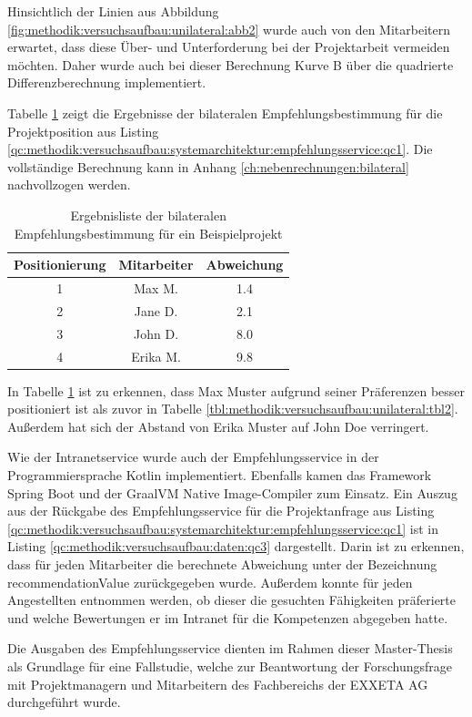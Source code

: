 Hinsichtlich der Linien aus Abbildung \ref{fig:methodik:versuchsaufbau:unilateral:abb2} wurde auch von den Mitarbeitern erwartet, dass diese Über- und Unterforderung bei der Projektarbeit vermeiden möchten. Daher wurde auch bei dieser Berechnung Kurve B über die quadrierte Differenzberechnung implementiert.

Tabelle \ref{tbl:methodik:versuchsaufbau:bilateral:tbl2} zeigt die Ergebnisse der bilateralen Empfehlungsbestimmung für die Projektposition aus Listing \ref{qc:methodik:versuchsaufbau:systemarchitektur:empfehlungsservice:qc1}. Die vollständige Berechnung kann in Anhang \ref{ch:nebenrechnungen:bilateral} nachvollzogen werden.

\begin{table}[h]
	\centering
	\begin{tabular}{c|c|c}
		\textbf{Positionierung} & \textbf{Mitarbeiter} & \textbf{Abweichung}\\
		\hline
		1 & Max M.   & 1.4\\
		2 & Jane D.  & 2.1\\
		3 & John D.  & 8.0\\
		4 & Erika M. & 9.8
	\end{tabular}
	\caption{Ergebnisliste der bilateralen Empfehlungsbestimmung für ein Beispielprojekt}
	\label{tbl:methodik:versuchsaufbau:bilateral:tbl2}
\end{table}

\newpage
In Tabelle \ref{tbl:methodik:versuchsaufbau:bilateral:tbl2} ist zu erkennen, dass Max Muster aufgrund seiner Präferenzen besser positioniert ist als zuvor in Tabelle \ref{tbl:methodik:versuchsaufbau:unilateral:tbl2}. Außerdem hat sich der Abstand von Erika Muster auf John Doe verringert.

Wie der Intranetservice wurde auch der Empfehlungsservice in der Programmiersprache Kotlin implementiert. Ebenfalls kamen das Framework Spring Boot und der GraalVM Native Image-Compiler zum Einsatz. Ein Auszug aus der Rückgabe des Empfehlungsservice für die Projektanfrage aus Listing \ref{qc:methodik:versuchsaufbau:systemarchitektur:empfehlungsservice:qc1} ist in Listing \ref{qc:methodik:versuchsaufbau:daten:qc3} dargestellt. Darin ist zu erkennen, dass für jeden Mitarbeiter die berechnete Abweichung unter der Bezeichnung recommendationValue zurückgegeben wurde. Außerdem konnte für jeden Angestellten entnommen werden, ob dieser die gesuchten Fähigkeiten präferierte und welche Bewertungen er im Intranet für die Kompetenzen abgegeben hatte.

Die Ausgaben des Empfehlungsservice dienten im Rahmen dieser Master-Thesis als Grundlage für eine Fallstudie, welche zur Beantwortung der Forschungsfrage mit Projektmanagern und Mitarbeitern des Fachbereichs \JES der EXXETA AG durchgeführt wurde.

